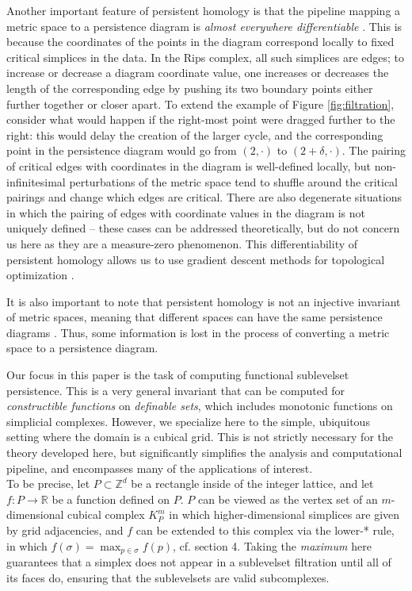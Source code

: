 \documentclass[conference]{IEEEtran}
\theoremstyle{definition}
\numberwithin{figure}{section}
\begin{document}
Another important feature of persistent homology is that the pipeline mapping a metric space to a persistence diagram is \emph{almost everywhere differentiable}  \cite{gameiro2016continuation,poulenard2018topological}. This is because the coordinates of the points in the diagram correspond locally to fixed critical simplices in the data. In the Rips complex, all such simplices are edges; to increase or decrease a diagram coordinate value, one increases or decreases the length of the corresponding edge by pushing its two boundary points either further together or closer apart. To extend the example of Figure \ref{fig:filtration}, consider what would happen if the right-most point were dragged further to the right: this would delay the creation of the larger cycle, and the corresponding point in the persistence diagram would go from $(2,\cdot)$ to $(2+\delta,\cdot)$.
The pairing of critical edges with coordinates in the diagram is well-defined locally, but non-infinitesimal perturbations of the metric space tend to shuffle around the critical pairings and change which edges are critical. There are also degenerate situations in which the pairing of edges with coordinate values in the diagram is not uniquely defined -- these cases can be addressed theoretically, but do not concern us here as they are a measure-zero phenomenon. This differentiability of persistent homology allows us to use gradient descent methods for topological optimization  \cite{carriere2021optimizing}.  


It is also important to note that persistent homology is not an injective invariant of metric spaces, meaning that different spaces can have the same persistence diagrams \cite{curry2018fiber,leygonie2021fiber,leygonie2021algorithmic}. Thus, some information is lost in the process of converting a metric space to a persistence diagram.


Our focus in this paper is the task of computing functional sublevelset persistence. This is a very general invariant that can be computed for \emph{constructible functions} on \emph{definable sets}, which includes monotonic functions on simplicial complexes. However, we specialize here to the simple, ubiquitous setting where the domain is a cubical grid. This is not strictly necessary for the theory developed here, but significantly simplifies the analysis and computational pipeline, and encompasses many of the applications of interest.\\

To be precise, let $P \subset \mathbb{Z}^d$ be a rectangle inside of the integer lattice, and let $f: P \to \mathbb{R}$ be a function defined on $P$. $P$ can be viewed as the vertex set of an $m$-dimensional cubical complex $K^{m}_{P}$ in which higher-dimensional simplices are given by grid adjacencies, and $f$ can be extended to this complex via the lower-* rule, in which $f(\sigma) = \max_{p \in \sigma}f(p)$, cf. \cite{bleile2021persistent} section 4. Taking the \emph{maximum} here guarantees that a simplex does not appear in a sublevelset filtration until all of its faces do, ensuring that the sublevelsets are valid subcomplexes.\\
\end{document}
